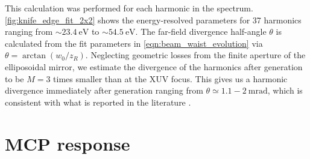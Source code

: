 This calculation was performed for each harmonic in the spectrum. \cref{fig:knife_edge_fit_2x2} shows the energy-resolved parameters for 37 harmonics ranging from $\sim 23.4 \ \textrm{eV}$ to $\sim 54.5 \ \textrm{eV}$. The far-field divergence half-angle $\theta$ is calculated from the fit parameters in \cref{eqn:beam_waist_evolution} via $\theta = \arctan(w_0 / z_R)$. Neglecting geometric losses from the finite aperture of the elliposoidal mirror, we estimate the divergence of the harmonics after generation to be $M = 3$ times smaller than at the XUV focus. This gives us a harmonic divergence immediately after generation ranging from $\theta \simeq 1.1 - 2 \ \textrm{mrad}$, which is consistent with what is reported in the literature \cite{tischAngularlyResolvedHighorder1994}.











\section{MCP response}

